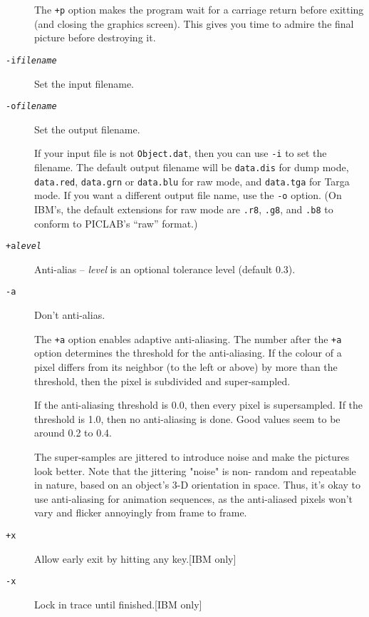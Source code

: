 \begin{description}
The {\tt +p} option makes the program wait for a carriage return before
exitting (and closing the graphics screen).  This gives you time to
admire the final picture before destroying it.

\item[{\tt -i{\em filename}}] %
Set the input filename.
\noitemsep
\item[{\tt -o{\em filename}}] %
Set the output filename.
\doitemsep

If your input file is not {\tt Object.dat}, then you can use {\tt -i}
to set the filename.  The default output filename will be
{\tt data.dis} for dump mode, {\tt data.red}, {\tt data.grn} or
{\tt data.blu} for raw mode, and {\tt data.tga} for Targa mode.
If you want a different output file name, use the {\tt -o} option.
(On IBM's, the default extensions for raw mode are {\tt .r8},
{\tt .g8}, and {\tt .b8} to conform to PICLAB's ``raw'' format.)

\item[{\tt +a{\em level}}] Anti-alias --
{\em level\/} is an optional tolerance level (default 0.3).
\noitemsep
\item[{\tt -a}] Don't anti-alias.
\doitemsep

The {\tt +a} option enables adaptive anti-aliasing.  The number
after the {\tt +a} option determines the threshold for the
anti-aliasing.  If the colour of a pixel differs from its neighbor
(to the left or above) by more than the threshold, then the
pixel is subdivided and super-sampled.

If the anti-aliasing threshold is 0.0, then every pixel is
supersampled.  If the threshold is 1.0, then no anti-aliasing
is done.  Good values seem to be around 0.2 to 0.4.

The super-samples are jittered to introduce noise and make the
pictures look better.  Note that the jittering "noise" is non-
random and repeatable in nature, based on an object's 3-D
orientation in space.  Thus, it's okay to use anti-aliasing for
animation sequences, as the anti-aliased pixels won't vary and
flicker annoyingly from frame to frame.

\item[{\tt +x}] Allow early exit by
hitting any key.\hfill[IBM only]
\noitemsep
\item[{\tt -x}] Lock in trace until finished.\hfill[IBM only]
\doitemsep


\end{description}
